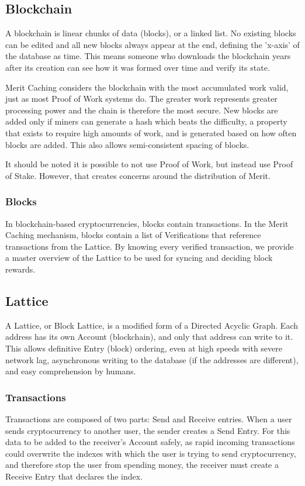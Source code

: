 \documentclass[14pt]{article}
\begin{document}
\label{sec:1.1}
\subsection{Blockchain}
A blockchain is linear chunks of data (blocks), or a linked list. No existing blocks can be edited and all new blocks always appear at the end, defining the 'x-axis' of the database as time. This means someone who downloads the blockchain years after its creation can see how it was formed over time and verify its state. 

Merit Caching considers the blockchain with the most accumulated work valid, just as most Proof of Work systems do. The greater work represents greater processing power and the chain is therefore the most secure. New blocks are added only if miners can generate a hash which beats the difficulty, a property that exists to require high amounts of work, and is generated based on how often blocks are added. This also allows semi-consistent spacing of blocks.

It should be noted it is possible to not use Proof of Work, but instead use Proof of Stake. However, that creates concerns around the distribution of Merit.

\label{sec:1.1.1}
\subsubsection{Blocks}
In blockchain-based cryptocurrencies, blocks contain transactions. In the Merit Caching mechanism, blocks contain a list of Verifications that reference transactions from the Lattice. By knowing every verified transaction, we provide a master overview of the Lattice to be used for syncing and deciding block rewards.

\label{sec:1.2}
\subsection{Lattice}
A Lattice, or Block Lattice, is a modified form of a Directed Acyclic Graph. Each address has its own Account (blockchain), and only that address can write to it. This allows definitive Entry (block) ordering, even at high speeds with severe network lag, asynchronous writing to the database (if the addresses are different), and easy comprehension by humans.

\label{sec:1.2.1}
\subsubsection{Transactions}
Transactions are composed of two parts: Send and Receive entries. When a user sends cryptocurrency to another user, the sender creates a Send Entry. For this data to be added to the receiver's Account safely, as rapid incoming transactions could overwrite the indexes with which the user is trying to send cryptocurrency, and therefore stop the user from spending money, the receiver must create a Receive Entry that declares the index.
\end{document}
